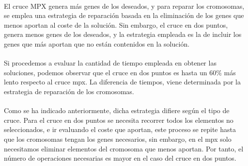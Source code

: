 	\paragraph{}El cruce MPX genera más genes de los deseados, y para reparar los cromosomas, se emplea una estrategia de reparación basada en la eliminación de los genes que menos aportan al coste de la solución. Sin embargo, el cruce en dos puntos, genera menos genes de los deseados, y la estrategia empleada es la de incluir los genes que más aportan que no están contenidos en la solución.
	
	\paragraph{}Si procedemos a evaluar la cantidad de tiempo empleada en obtener las soluciones, podemos observar que el cruce en dos puntos es hasta un 60\% más lento respecto al cruce mpx. La diferencia de tiempos, viene determinada por la estrategia de reparación de los cromosomas.
	
	\paragraph{}Como se ha indicado anteriormente, dicha estrategia difiere según el tipo de cruce. Para el cruce en dos puntos se necesita recorrer todos los elementos no seleccionados, e ir evaluando el coste que aportan, este proceso se repite hasta que los cromosomas tengan los genes necesarios, sin embargo, en el mpx solo necesitamos eliminar elementos del cromosoma que menos aportan. Por tanto, el número de operaciones necesarias es mayor en el caso del cruce en dos puntos.
	
	
	
	
	

	
	\paragraph{} 
	
